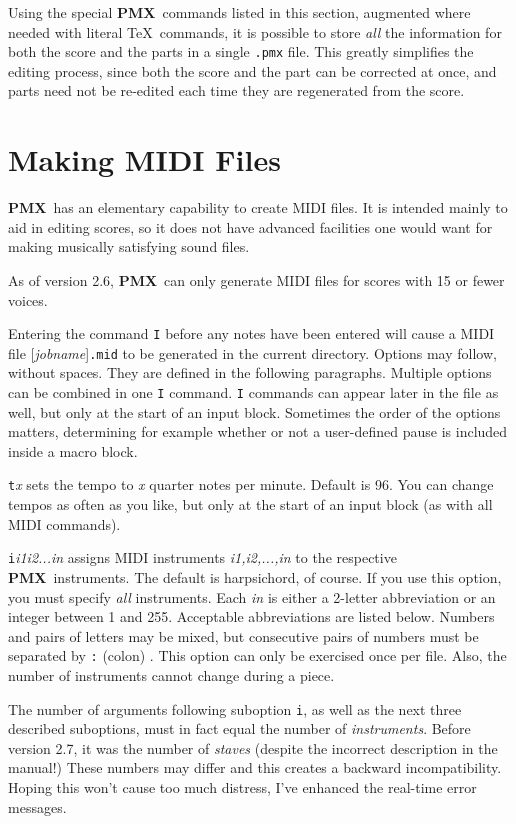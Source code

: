 \documentclass[11pt]{article}
\newcommand\PMXX{\textbf{PMX}}
\newcommand\PMX{\PMXX~}
\def\newfrom{2.59}  %
\def\NEW#1{\ifdim#1 pt<\newfrom pt\else%
\marginpar{\fbox{#1}}\fi}
\begin{document}
Using the special \PMX commands listed in this section, 
augmented where needed with literal \TeX ~commands, it is possible to store 
{\it all} the information for both the score and the parts in a single 
{\tt .pmx} file.  This greatly simplifies the editing process, since 
both the score and the part can be corrected at once, and parts need not be
re-edited each time they are regenerated from the score.

\section{Making MIDI Files}\label{MIDI}

\PMX has an elementary capability to create MIDI files. It is intended mainly 
to aid in editing scores, so it does not have advanced facilities one would 
want for making musically satisfying sound files.

As \NEW{2.6} of version 2.6, \PMX can only generate MIDI files for scores with 
15 or fewer voices. 

Entering the command {\tt I} before any notes have been entered 
will cause a MIDI file [{\it jobname}]{\tt.mid} to be 
generated in the current directory.  Options may follow, without spaces.  They
are defined in the following paragraphs.  Multiple 
options can be combined in one {\tt I} command.  
{\tt I} commands can appear later in the file as well, but only at the start 
of an input block.  Sometimes the order of the 
options matters, determining for example whether or not a user-defined pause 
is included inside a macro block.  

{\tt t}{\it x} sets the tempo to {\it x} quarter notes per minute. 
Default is 96.  You can change tempos as often as you like, but only at the
start of an input block (as with all MIDI commands).

{\tt i}{\it i1i2...in} assigns MIDI instruments {\it i1,i2,...,in} to the
respective \PMX instruments. The default is harpsichord, of course.  If
you use this option, you must specify {\it all} instruments.
Each {\it in} is either 
a 2-letter abbreviation or an integer between 1 and 255. Acceptable 
abbreviations are listed below.  Numbers and pairs of letters may be mixed, 
but consecutive pairs of numbers must be separated by {\tt :} (colon) .  
This option can only be exercised once per file. 
Also, the number of instruments cannot change during a piece.

The \NEW{2.7} number of arguments following suboption {\tt i}, as well as the next 
three described suboptions, must in fact equal the number of {\it instruments}. Before
version 2.7, it was the number of {\it staves} (despite the incorrect 
description in the manual!) These numbers may differ and this creates a
backward incompatibility. Hoping this won't cause too much distress, 
I've enhanced the real-time error messages. 
\end{document}
